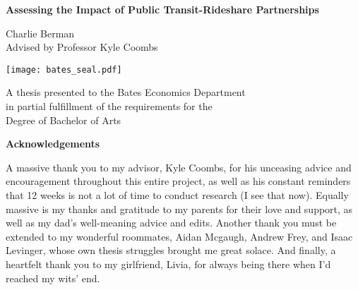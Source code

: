 \documentclass [12pt]{report}
\begin{document}
\begin{titlepage}
    \begin{center}
        \vspace*{1cm}
            
        \Huge
        \textbf{Assessing the Impact of Public Transit-Rideshare Partnerships}
        
            
            
        \vspace{1cm}
        \large
        Charlie Berman\\
        Advised by Professor Kyle Coombs
        \vspace{0.5cm}

                                
        \texttt{[image: bates\_seal.pdf]}

        \vspace{0.6cm}
        \normalsize
        A thesis presented to the Bates Economics Department\\
        in partial fulfillment of the requirements for the\\
        Degree of Bachelor of Arts

        

        
    \end{center}
\end{titlepage}
\begin{center}
    \Large
    \textbf{Acknowledgements}\\
    \linespread{1.5}
    \normalsize
    \raggedright
     A massive thank you to my advisor, Kyle Coombs, for his unceasing advice and encouragement throughout this entire project, as well as his constant reminders that 12 weeks is not a lot of time to conduct research (I see that now). Equally massive is my thanks and gratitude to my parents for their love and support, as well as my dad's well-meaning advice and edits. Another thank you must be extended to my wonderful roommates, Aidan Mcgaugh, Andrew Frey, and Isaac Levinger, whose own thesis struggles brought me great solace. And finally, a heartfelt thank you to my girlfriend, Livia, for always being there when I'd reached my wits' end.  
\end{center}
\tableofcontents
\newpage
{}

\end{document}
